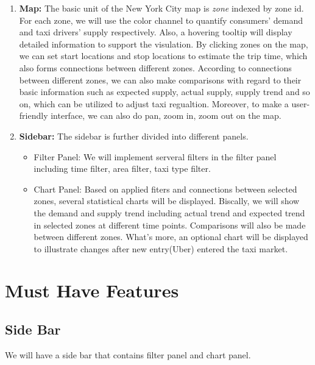 \documentclass{article}
\begin{document}
                \begin{enumerate}
                    \item   \textbf{Map:} The basic unit of the New York City map is \textit{zone} indexed by zone id. For each zone, we will use the color channel
                            to quantify consumers' demand and taxi drivers' supply respectively. Also, a hovering tooltip will display detailed information to support the visulation.
                            By clicking zones on the map, we can set start locations and stop locations to estimate the trip time, which also forms connections between different zones.
                            According to connections between different zones, we can also make comparisons with regard to their basic information such as expected supply, actual supply,
                            supply trend and so on, which can be utilized to adjust taxi regualtion. Moreover, to make a user-friendly interface, we can also do pan, zoom in, zoom out on the map. 
                    \item   \textbf{Sidebar:} The sidebar is further divided into different panels.
                            \begin{itemize}
                                \item Filter Panel: We will implement serveral filters in the filter panel including  time filter, area filter, taxi type filter.
                                \item Chart Panel: Based on applied fiters and connections between selected zones, several statistical charts will be displayed. Biscally,
                                      we will show the demand and supply trend including actual trend and expected trend in selected zones at different time points. Comparisons will also be made
                                      between different zones. What's more, an optional chart will be displayed to illustrate changes after new entry(Uber) entered the taxi market.
                            \end{itemize}
                \end{enumerate}
        \section{Must Have Features}
        \subsection{Side Bar}
        We will have a side bar that contains filter panel and  chart panel.
            
\end{document}
